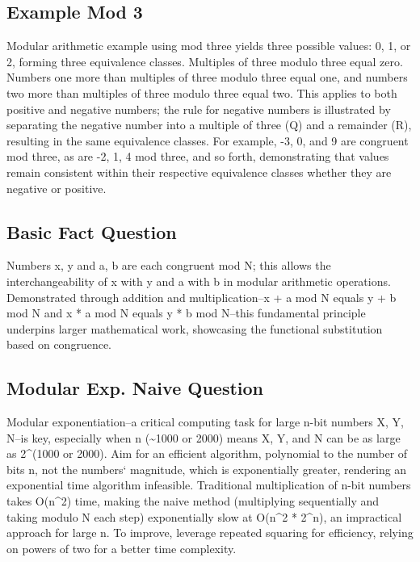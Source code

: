 \subsection*{Example  Mod 3}
Modular arithmetic example using mod three yields three possible values: 0, 1, or 2, forming three equivalence classes.
Multiples of three modulo three equal zero.
Numbers one more than multiples of three modulo three equal one, and numbers two more than multiples of three modulo three equal two.
This applies to both positive and negative numbers; the rule for negative numbers is illustrated by separating the negative number into a multiple of three (Q) and a remainder (R), resulting in the same equivalence classes.
For example, -3, 0, and 9 are congruent mod three, as are -2, 1, 4 mod three, and so forth, demonstrating that values remain consistent within their respective equivalence classes whether they are negative or positive.

\subsection*{Basic Fact Question}
Numbers x, y and a, b are each congruent mod N; this allows the interchangeability of x with y and a with b in modular arithmetic operations.
Demonstrated through addition and multiplication--x + a mod N equals y + b mod N and x * a mod N equals y * b mod N--this fundamental principle underpins larger mathematical work, showcasing the functional substitution based on congruence.

\subsection*{Modular Exp.  Naive Question}
Modular exponentiation--a critical computing task for large n-bit numbers X, Y, N--is key, especially when n (\textasciitilde{}1000 or 2000) means X, Y, and N can be as large as 2\textasciicircum{}(1000 or 2000).
Aim for an efficient algorithm, polynomial to the number of bits n, not the numbers` magnitude, which is exponentially greater, rendering an exponential time algorithm infeasible.
Traditional multiplication of n-bit numbers takes O(n\textasciicircum{}2) time, making the naive method (multiplying sequentially and taking modulo N each step) exponentially slow at O(n\textasciicircum{}2 * 2\textasciicircum{}n), an impractical approach for large n.
To improve, leverage repeated squaring for efficiency, relying on powers of two for a better time complexity.

